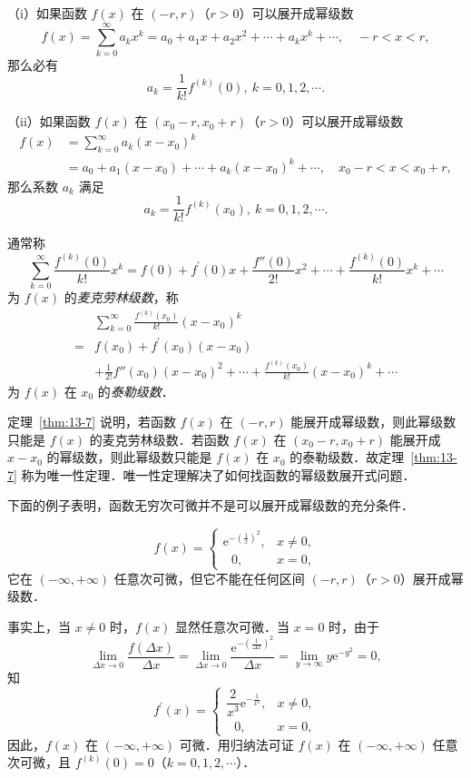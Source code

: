 \begin{theorem}[唯一性]\label{thm:13-7}
（i）如果函数 $f(x)$ 在 $(-r,r)$（$r>0$）可以展开成幂级数
\[
f(x)=\sum_{k=0}^{\infty}a_{k}x^{k}=a_{0}+a_{1}x+a_{2}x^{2}+\cdots+a_{k}x^{k}+\cdots,\quad -r<x<r,
\]
那么必有
\[
a_{k}=\frac{1}{k!}f^{(k)}(0),\ k=0,1,2,\cdots.
\]

（ii）如果函数 $f(x)$ 在 $(x_{0}-r,x_{0}+r)$（$r>0$）可以展开成幂级数
\[
\begin{aligned}
f(x)&=\sum_{k=0}^{\infty}a_{k}(x-x_{0})^{k}\\
&=a_{0}+a_{1}(x-x_{0})+\cdots+a_{k}(x-x_{0})^{k}+\cdots,\quad x_{0}-r<x<x_{0}+r,
\end{aligned}
\]
那么系数 $a_{k}$ 满足
\[
a_{k}=\frac{1}{k!}f^{(k)}(x_{0}),\ k=0,1,2,\cdots.
\]
\end{theorem}

通常称
\[
\sum_{k=0}^{\infty}\frac{f^{(k)}(0)}{k!}x^{k}=f(0)+f^{\prime}(0)x+\frac{f''(0)}{2!}x^{2}+\cdots+\frac{f^{(k)}(0)}{k!}x^{k}+\cdots
\]
为 $f(x)$ 的\emph{麦克劳林级数}，称
\[
\begin{aligned}
&\sum_{k=0}^{\infty}\frac{f^{(k)}(x_{0})}{k!}(x-x_{0})^{k}\\
={}&f(x_{0})+f^{\prime}(x_{0})(x-x_{0})\\
&+\frac{1}{2!}f''(x_{0})(x-x_{0})^{2}+\cdots+\frac{f^{(k)}(x_{0})}{k!}(x-x_{0})^{k}+\cdots
\end{aligned}
\]
为 $f(x)$ 在 $x_{0}$ 的\emph{泰勒级数}．

定理~\ref{thm:13-7} 说明，若函数 $f(x)$ 在 $(-r,r)$ 能展开成幂级数，则此幂级数只能是 $f(x)$ 的麦克劳林级数．若函数 $f(x)$ 在 $(x_{0}-r,x_{0}+r)$ 能展开成 $x-x_{0}$ 的幂级数，则此幂级数只能是 $f(x)$ 在 $x_{0}$ 的泰勒级数．故定理~\ref{thm:13-7} 称为唯一性定理．唯一性定理解决了如何找函数的幂级数展开式问题．

下面的例子表明，函数无穷次可微并不是可以展开成幂级数的充分条件．

\begin{example}\label{ex:13-3-1}
\[
f(x)=\begin{cases}
\mathrm{e}^{-\left(\frac{1}{x}\right)^{2}}, & x\neq 0,\\
\ \ \ 0, & x=0,
\end{cases}
\]
它在 $(-\infty,+\infty)$ 任意次可微，但它不能在任何区间 $(-r,r)$（$r>0$）展开成幂级数．
\end{example}

事实上，当 $x\neq 0$ 时，$f(x)$ 显然任意次可微．当 $x=0$ 时，由于
\[
\lim_{\Delta x\to 0}\frac{f(\Delta x)}{\Delta x}=\lim_{\Delta x\to 0}\frac{\mathrm{e}^{-\left(\frac{1}{\Delta x}\right)^{2}}}{\Delta x}=\lim_{y\to\infty}y\mathrm{e}^{-y^{2}}=0,
\]
知
\[
f^{\prime}(x)=\begin{cases}
\dfrac{2}{x^{3}}\mathrm{e}^{-\frac{1}{x^{2}}}, & x\neq 0,\\
\ \ \ 0, & x=0,
\end{cases}
\]
因此，$f(x)$ 在 $(-\infty,+\infty)$ 可微．用归纳法可证 $f(x)$ 在 $(-\infty,+\infty)$ 任意次可微，且 $f^{(k)}(0)=0$（$k=0,1,2,\cdots$）．


